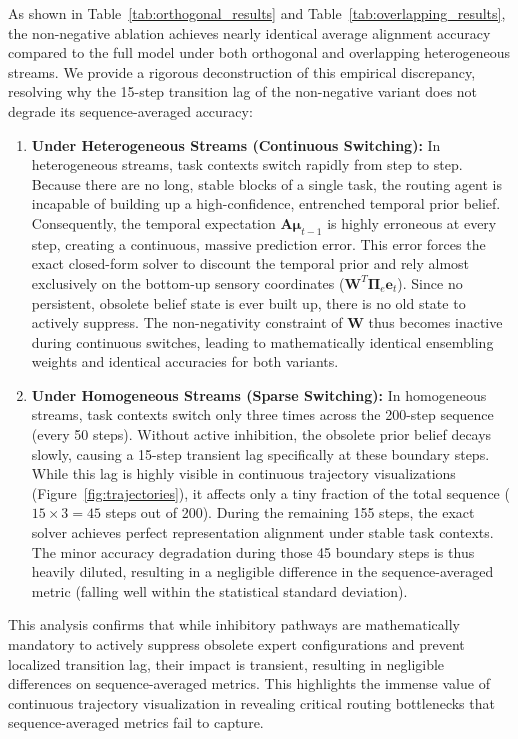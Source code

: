 \documentclass{article}
\theoremstyle{plain}
\theoremstyle{definition}
\theoremstyle{remark}
\begin{document}
As shown in Table~\ref{tab:orthogonal_results} and Table~\ref{tab:overlapping_results}, the non-negative ablation achieves nearly identical average alignment accuracy compared to the full model under both orthogonal and overlapping heterogeneous streams. We provide a rigorous deconstruction of this empirical discrepancy, resolving why the 15-step transition lag of the non-negative variant does not degrade its sequence-averaged accuracy:
\begin{enumerate}
    \item \textbf{Under Heterogeneous Streams (Continuous Switching):} In heterogeneous streams, task contexts switch rapidly from step to step. Because there are no long, stable blocks of a single task, the routing agent is incapable of building up a high-confidence, entrenched temporal prior belief. Consequently, the temporal expectation $\mathbf{A}\mathbf{\mu}_{t-1}$ is highly erroneous at every step, creating a continuous, massive prediction error. This error forces the exact closed-form solver to discount the temporal prior and rely almost exclusively on the bottom-up sensory coordinates ($\mathbf{W}^T \mathbf{\Pi}_e \mathbf{e}_t$). Since no persistent, obsolete belief state is ever built up, there is no old state to actively suppress. The non-negativity constraint of $\mathbf{W}$ thus becomes inactive during continuous switches, leading to mathematically identical ensembling weights and identical accuracies for both variants.
    \item \textbf{Under Homogeneous Streams (Sparse Switching):} In homogeneous streams, task contexts switch only three times across the 200-step sequence (every 50 steps). Without active inhibition, the obsolete prior belief decays slowly, causing a 15-step transient lag specifically at these boundary steps. While this lag is highly visible in continuous trajectory visualizations (Figure~\ref{fig:trajectories}), it affects only a tiny fraction of the total sequence ($15 \times 3 = 45$ steps out of 200). During the remaining 155 steps, the exact solver achieves perfect representation alignment under stable task contexts. The minor accuracy degradation during those 45 boundary steps is thus heavily diluted, resulting in a negligible difference in the sequence-averaged metric (falling well within the statistical standard deviation).
\end{enumerate}
This analysis confirms that while inhibitory pathways are mathematically mandatory to actively suppress obsolete expert configurations and prevent localized transition lag, their impact is transient, resulting in negligible differences on sequence-averaged metrics. This highlights the immense value of continuous trajectory visualization in revealing critical routing bottlenecks that sequence-averaged metrics fail to capture.
\end{document}
